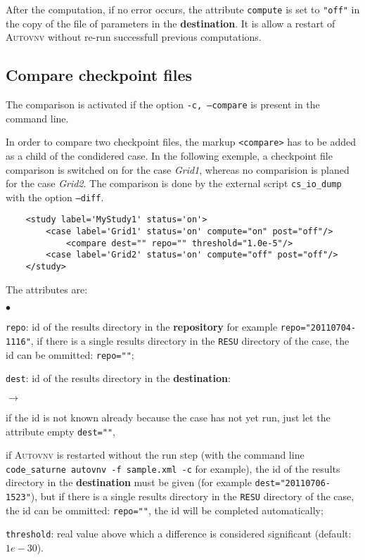 \documentclass[a4paper,10pt,twoside]{article}
\begin{document}
After the computation, if no error occurs, the attribute \texttt{compute} is set to \texttt{"off"}
in the copy of the file of parameters in the \textbf{destination}. It is allow a restart
of \textsc{Autovnv} without re-run successfull previous computations.

\subsection{Compare checkpoint files}

The comparison is activated if the option \texttt{-c, --compare} is present in the command line.

In order to compare two checkpoint files, the markup \texttt{<compare>} has to be added as
a child of the condidered case. In the following exemple, a checkpoint file comparison
is switched on for the case \textit{Grid1}, whereas no comparision is planed for the case
\textit{Grid2}.
The comparison is done by the external script \texttt{cs\_io\_dump} with the option \texttt{--diff}.

\begin{verbatim}
    <study label='MyStudy1' status='on'>
        <case label='Grid1' status='on' compute="on" post="off"/>
            <compare dest="" repo="" threshold="1.0e-5"/>
        <case label='Grid2' status='on' compute="off" post="off"/>
    </study>
\end{verbatim}

The attributes are:
\begin{list}{$\bullet$}{}

\item \texttt{repo}: id of the results directory in the \textbf{repository} for example \texttt{repo="20110704-1116"},
if there is a single results directory in the \texttt{RESU} directory of the case, the id can be ommitted: \texttt{repo=""};

\item \texttt{dest}: id of the results directory in the \textbf{destination}:
\begin{list}{$\rightarrow$}{}
\item if the id is not known already because the case has not yet run, just let the attribute empty \texttt{dest=""},
\item if \textsc{Autovnv} is restarted without the run step (with the command line \texttt{code\_saturne
autovnv -f sample.xml -c} for example), the id of the results directory in
the \textbf{destination} must be given (for example \texttt{dest="20110706-1523"}), but if there is a single results directory in the \texttt{RESU} directory
of the case, the id can be ommitted: \texttt{repo=""}, the id will be completed automatically;
\end{list}
\item \texttt{threshold}: real value above which a difference is considered significant (default: $1e-30$).
\end{list}
\end{document}
